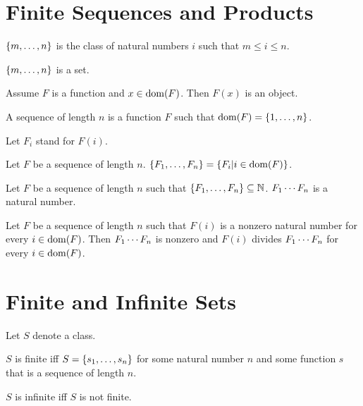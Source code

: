 \documentclass[11pt]{article}
\begin{document}
\section{Finite Sequences and Products}

\begin{forthel}

\begin{definition}
$\{m,\dots,n\}$ is the class of
natural numbers $i$ such that $m \leq i \leq n$.
\end{definition}

\begin{axiom}
$\{m,\dots,n\}$ is a set.
\end{axiom}

\begin{axiom}
Assume $F$ is a function and $x \in \operatorname{dom}(F)$.
Then $F(x)$ is an object.
\end{axiom}

\begin{definition}
A sequence of length $n$ is a
function $F$ such that $\operatorname{dom}(F) = \{1,\dots,n\}$.
\end{definition}

Let $F_{i}$ stand for $F(i)$.

\begin{definition}
Let $F$ be a sequence of length $n$.
$\{F_{1},\dots,F_{n}\} = \{ F_{i} | i \in \operatorname{dom}(F)\}$.
\end{definition}

\begin{signature}
Let $F$ be a sequence of length $n$
such that $\{F_{1},\dots,F_{n}\} \subseteq \mathbb{N}$.
$F_{1} \cdots F_{n}$ is a natural number.
\end{signature}

\begin{axiom}[Factorproperty]
Let $F$ be a sequence of length $n$
such that $F(i)$ is a nonzero natural number for every $i \in \operatorname{dom}(F)$.
Then $F_{1} \cdots F_{n}$ is nonzero and
$F(i)$ divides $F_{1} \cdots F_{n}$ for every $i \in \operatorname{dom}(F)$.
\end{axiom}

\end{forthel}


\section{Finite and Infinite Sets}

\begin{forthel}

Let $S$ denote a class.

\begin{definition}
$S$ is finite iff
$S = \{s_{1},\dots,s_{n}\}$ for some natural number $n$ and some function $s$ that is
a sequence of length $n$.
\end{definition}

\begin{definition}
$S$ is infinite iff $S$ is not finite.
\end{definition}

\end{forthel}
\end{document}
